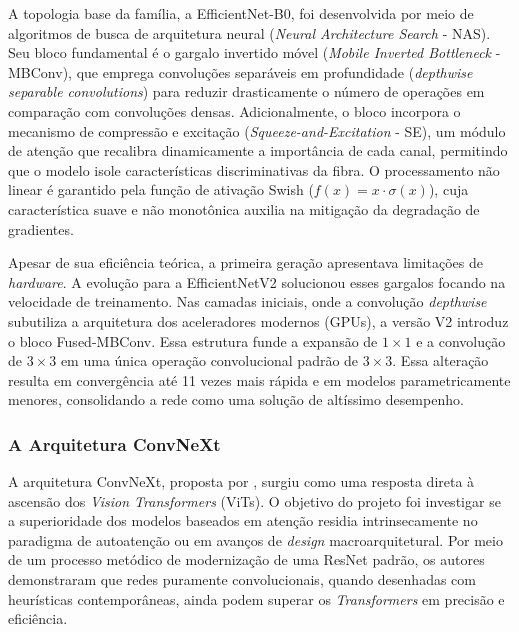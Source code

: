         A topologia base da família, a EfficientNet-B0, foi desenvolvida por meio de algoritmos de busca de arquitetura neural (\textit{Neural Architecture Search} - NAS). Seu bloco fundamental é o gargalo invertido móvel (\textit{Mobile Inverted Bottleneck} - MBConv), que emprega convoluções separáveis em profundidade (\textit{depthwise separable convolutions}) para reduzir drasticamente o número de operações em comparação com convoluções densas. Adicionalmente, o bloco incorpora o mecanismo de compressão e excitação (\textit{Squeeze-and-Excitation} - SE), um módulo de atenção que recalibra dinamicamente a importância de cada canal, permitindo que o modelo isole características discriminativas da fibra. O processamento não linear é garantido pela função de ativação Swish ($f(x) = x \cdot \sigma(x)$), cuja característica suave e não monotônica auxilia na mitigação da degradação de gradientes.

        Apesar de sua eficiência teórica, a primeira geração apresentava limitações de \textit{hardware}. A evolução para a EfficientNetV2 \cite{tan2021efficientnetv2} solucionou esses gargalos focando na velocidade de treinamento. Nas camadas iniciais, onde a convolução \textit{depthwise} subutiliza a arquitetura dos aceleradores modernos (GPUs), a versão V2 introduz o bloco Fused-MBConv. Essa estrutura funde a expansão de $1 \times 1$ e a convolução de $3 \times 3$ em uma única operação convolucional padrão de $3 \times 3$. Essa alteração resulta em convergência até 11 vezes mais rápida e em modelos parametricamente menores, consolidando a rede como uma solução de altíssimo desempenho.


    \subsubsection{A Arquitetura ConvNeXt}

        A arquitetura ConvNeXt, proposta por , surgiu como uma resposta direta à ascensão dos \textit{Vision Transformers} (ViTs). O objetivo do projeto foi investigar se a superioridade dos modelos baseados em atenção residia intrinsecamente no paradigma de autoatenção ou em avanços de \textit{design} macroarquitetural. Por meio de um processo metódico de modernização de uma ResNet padrão, os autores demonstraram que redes puramente convolucionais, quando desenhadas com heurísticas contemporâneas, ainda podem superar os \textit{Transformers} em precisão e eficiência.

